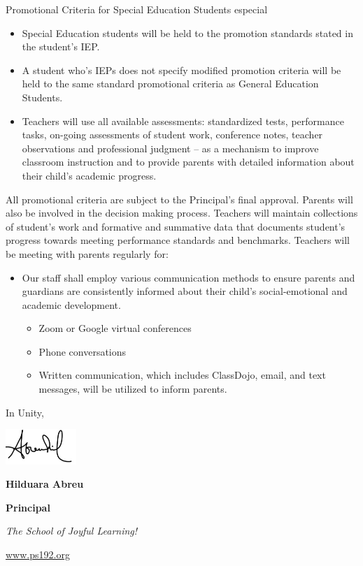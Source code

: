 \documentclass[12pt,letterpaper]{article}
\begin{document}
Promotional Criteria for Special Education Students especial\begin{itemize}
\item Special Education students will be held to the promotion standards stated in the student’s IEP.
\item A student who’s IEPs does not specify modified promotion 
criteria will be held to the same standard promotional criteria as General Education Students.
\item Teachers will use all available assessments: standardized tests, performance tasks, on-going assessments of student work, conference notes, teacher observations and professional judgment – as a
mechanism to improve classroom instruction and to provide parents with detailed information about their child’s academic progress.
\end{itemize}
All promotional criteria are subject to the Principal’s final approval. Parents will also be involved in the decision making process. Teachers will maintain collections of student’s work and formative and summative data that documents student’s progress towards meeting performance standards and benchmarks. Teachers will be meeting with parents regularly for:
\begin{itemize}

\item Our staff shall employ various communication methods to ensure parents and guardians are consistently informed about their child’s social-emotional and academic development.
	\begin{itemize}
	\item Zoom or Google virtual conferences
	\item Phone conversations
	\item Written communication, which includes ClassDojo, email, and text messages, will be utilized to inform parents.
	\end{itemize}
\end{itemize}
\pagebreak
\vspace*{1.5cm}

In Unity,

\includegraphics[width=0.2\textwidth]{hil_signature}

\textbf{Hilduara Abreu}

\textbf{Principal}

\textit{The School of Joyful Learning!}

\url{www.ps192.org}
\end{document}
